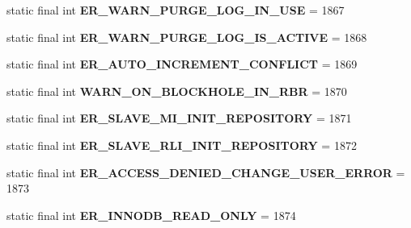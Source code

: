 \begin{DoxyCompactItemize}
static final int {\bfseries E\+R\+\_\+\+W\+A\+R\+N\+\_\+\+P\+U\+R\+G\+E\+\_\+\+L\+O\+G\+\_\+\+I\+N\+\_\+\+U\+SE} = 1867
\item 
\mbox{\label{classcom_1_1mysql_1_1jdbc_1_1_mysql_error_numbers_a7739d9100276d218d91b1079e89722df}} 
static final int {\bfseries E\+R\+\_\+\+W\+A\+R\+N\+\_\+\+P\+U\+R\+G\+E\+\_\+\+L\+O\+G\+\_\+\+I\+S\+\_\+\+A\+C\+T\+I\+VE} = 1868
\item 
\mbox{\label{classcom_1_1mysql_1_1jdbc_1_1_mysql_error_numbers_acea24aa48f8e843afa10044ff8b6737d}} 
static final int {\bfseries E\+R\+\_\+\+A\+U\+T\+O\+\_\+\+I\+N\+C\+R\+E\+M\+E\+N\+T\+\_\+\+C\+O\+N\+F\+L\+I\+CT} = 1869
\item 
\mbox{\label{classcom_1_1mysql_1_1jdbc_1_1_mysql_error_numbers_ae56a8afb3b52a40374d35f0806354041}} 
static final int {\bfseries W\+A\+R\+N\+\_\+\+O\+N\+\_\+\+B\+L\+O\+C\+K\+H\+O\+L\+E\+\_\+\+I\+N\+\_\+\+R\+BR} = 1870
\item 
\mbox{\label{classcom_1_1mysql_1_1jdbc_1_1_mysql_error_numbers_a7de130d7f1266f9aa59f58eee8048779}} 
static final int {\bfseries E\+R\+\_\+\+S\+L\+A\+V\+E\+\_\+\+M\+I\+\_\+\+I\+N\+I\+T\+\_\+\+R\+E\+P\+O\+S\+I\+T\+O\+RY} = 1871
\item 
\mbox{\label{classcom_1_1mysql_1_1jdbc_1_1_mysql_error_numbers_a53c9c2b2f2659d7626203e0f1f2938b5}} 
static final int {\bfseries E\+R\+\_\+\+S\+L\+A\+V\+E\+\_\+\+R\+L\+I\+\_\+\+I\+N\+I\+T\+\_\+\+R\+E\+P\+O\+S\+I\+T\+O\+RY} = 1872
\item 
\mbox{\label{classcom_1_1mysql_1_1jdbc_1_1_mysql_error_numbers_af9870ab69ac3192d4feda286c4e6d949}} 
static final int {\bfseries E\+R\+\_\+\+A\+C\+C\+E\+S\+S\+\_\+\+D\+E\+N\+I\+E\+D\+\_\+\+C\+H\+A\+N\+G\+E\+\_\+\+U\+S\+E\+R\+\_\+\+E\+R\+R\+OR} = 1873
\item 
\mbox{\label{classcom_1_1mysql_1_1jdbc_1_1_mysql_error_numbers_a9da5a92766f55589db3b3ce1748e5eb4}} 
static final int {\bfseries E\+R\+\_\+\+I\+N\+N\+O\+D\+B\+\_\+\+R\+E\+A\+D\+\_\+\+O\+N\+LY} = 1874

\end{DoxyCompactItemize}
